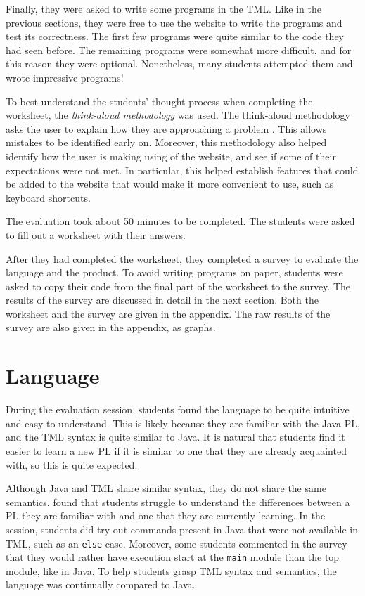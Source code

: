 Finally, they were asked to write some programs in the TML. Like in the previous sections, they were free to use the website to write the programs and test its correctness. The first few programs were quite similar to the code they had seen before. The remaining programs were somewhat more difficult, and for this reason they were optional. Nonetheless, many students attempted them and wrote impressive programs!

To best understand the students' thought process when completing the worksheet, the \emph{think-aloud methodology} was used. The think-aloud methodology asks the user to explain how they are approaching a problem \citep{jorgensen1990thinking}. This allows mistakes to be identified early on. Moreover, this methodology also helped identify how the user is making using of the website, and see if some of their expectations were not met. In particular, this helped establish features that could be added to the website that would make it more convenient to use, such as keyboard shortcuts.

The evaluation took about 50 minutes to be completed. The students were asked to fill out a worksheet with their answers. 

After they had completed the worksheet, they completed a survey to evaluate the language and the product. To avoid writing programs on paper, students were asked to copy their code from the final part of the worksheet to the survey. The results of the survey are discussed in detail in the next section. Both the worksheet and the survey are given in the appendix. The raw results of the survey are also given in the appendix, as graphs. 

\section{Language} 
During the evaluation session, students found the language to be quite intuitive and easy to understand. This is likely because they are familiar with the Java PL, and the TML syntax is quite similar to Java. It is natural that students find it easier to learn a new PL if it is similar to one that they are already acquainted with, so this is quite expected. 

Although Java and TML share similar syntax, they do not share the same semantics. \citet{tshukudu2021teachers} found that students struggle to understand the differences between a PL they are familiar with and one that they are currently learning. In the session, students did try out commands present in Java that were not available in TML, such as an \texttt{else} case. Moreover, some students commented in the survey that they would rather have execution start at the \texttt{main} module than the top module, like in Java. To help students grasp TML syntax and semantics, the language was continually compared to Java.

